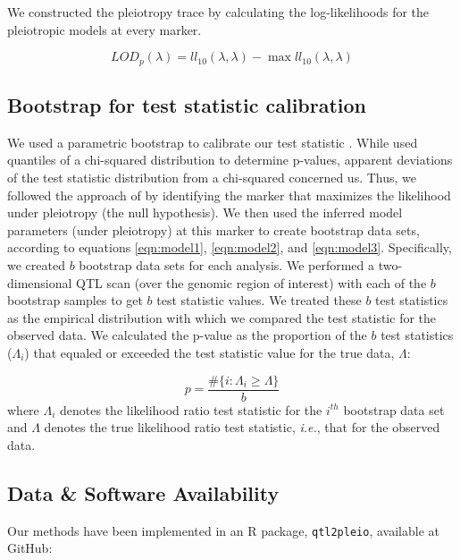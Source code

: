 \documentclass[12pt,twoside, lineno]{gsajnl}
\begin{document}
We constructed the pleiotropy trace by calculating the log-likelihoods
for the pleiotropic models at every marker.

\begin{equation}
LOD_{p}(\lambda) = ll_{10}(\lambda, \lambda) - \max ll_{10}(\lambda, \lambda)
\label{eq:lodp}
\end{equation}




\subsection{Bootstrap for test statistic calibration}

We used a parametric bootstrap to calibrate our test statistic
\citep{efron1979}. While \citet{jiang1995multiple} used quantiles of a
chi-squared distribution to determine p-values, apparent deviations of
the test statistic distribution from a chi-squared concerned us. Thus,
we followed the approach of \citet{tian2016dissection} by identifying
the marker that maximizes the likelihood under pleiotropy (the null
hypothesis). We then used the inferred model parameters (under
pleiotropy) at this marker to create bootstrap data sets, according to
equations \ref{eqn:model1}, \ref{eqn:model2}, and \ref{eqn:model3}.
Specifically, we created $b$ bootstrap data sets for each analysis. We
performed a two-dimensional QTL scan (over the genomic region of
interest) with each of the $b$ bootstrap samples to get $b$ test
statistic values. We treated these $b$ test statistics as the
empirical distribution with which we compared the test statistic for
the observed data. We calculated the p-value as the proportion of the
$b$ test statistics ($\Lambda_i$) that equaled or exceeded the test
statistic value for the true data, $\Lambda$:

\begin{equation}
p = \frac{\# \lbrace i:\Lambda_i \geq \Lambda\rbrace}{b}
\end{equation}
where $\Lambda_{i}$ denotes the likelihood ratio test statistic for
the $i^{th}$ bootstrap data set and $\Lambda$ denotes the true
likelihood ratio test statistic, \textit{i.e.}, that for the observed
data.

\subsection{Data \& Software Availability}

Our methods have been implemented in an R package, \texttt{qtl2pleio},
available at GitHub:
\end{document}
